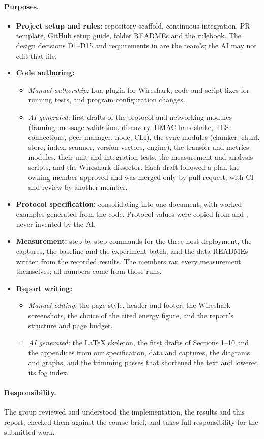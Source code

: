 \paragraph{Purposes.}
\begin{itemize}
  \item \textbf{Project setup and rules:} repository scaffold, continuous integration, PR
    template, GitHub setup guide, folder READMEs and the  rulebook. The design
    decisions D1--D15 and requirements in  are the team's; the AI may
    not edit that file.
  \item \textbf{Code authoring:}
    \begin{itemize}
      \item \emph{Manual authorship:} Lua plugin for Wireshark, code and script fixes for running tests, and program configuration changes.
      \item \emph{AI generated:} first drafts of the protocol and networking modules (framing,
        message validation, discovery, HMAC handshake, TLS, connections, peer manager, node, CLI),
        the sync modules (chunker, chunk store, index, scanner, version vectors, engine), the
        transfer and metrics modules, their unit and integration tests, the measurement and
        analysis scripts, and the Wireshark dissector. Each draft followed a plan the owning member
        approved and was merged only by pull request, with CI and review by another member.
    \end{itemize}
  \item \textbf{Protocol specification:} consolidating  into one document, with
    worked examples generated from the code. Protocol values were copied from
     and , never invented by the AI.
  \item \textbf{Measurement:} step-by-step commands for the three-host deployment, the captures,
    the baseline and the experiment batch, and the data READMEs written from the recorded results.
    The members ran every measurement themselves; all numbers come from those runs.
  \item \textbf{Report writing:}
    \begin{itemize}
      \item \emph{Manual editing:} the page style, header and footer, the Wireshark screenshots,
        the choice of the cited energy figure, and the report's structure and page budget.
      \item \emph{AI generated:} the LaTeX skeleton, the first drafts of Sections 1--10 and the
        appendices from our specification, data and captures, the diagrams and graphs, and the
        trimming passes that shortened the text and lowered its fog index.
    \end{itemize}
\end{itemize}

\paragraph{Responsibility.} The group reviewed and understood the implementation, the results and
this report, checked them against the course brief, and takes full responsibility for the
submitted work.
